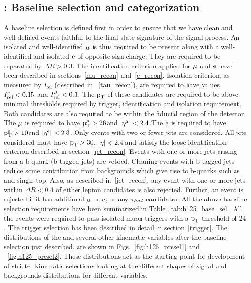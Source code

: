 \subsection{\hmue: Baseline selection and categorization}
\label{h125_presel_cat}
A baseline selection is defined first in order to ensure that we have clean and well-defined events faithful to the final state signature of the signal process. An isolated and well-identified $\mu$ is thus required to be present along with a well-identified and isolated $\text{e}$ of opposite sign charge. They are required to be separated by $\Delta R > 0.3$. The identification criterion applied for $\mu$ and $\text{e}$ have been described in sections~\ref{mu_recon} and~\ref{e_recon}. Isolation criterion, as measured by $I_\text{rel}$ (described in ~\ref{tau_recon}), are required to have values $I_\text{rel}^{\text{e}} < 0.15$ and $I_\text{rel}^{\mu} < 0.1$. The $\text{p}_\text{T}$ of these candidates are required to be above minimal thresholds required by trigger, identification and isolation requirement. Both candidates are also required to be within the fiducial region of the detector. The $\mu$ is required to have $\text{p}_\text{T}^{\mu} > 26$\GeV and $|\eta^{\mu}|<2.4$.The $\text{e}$ is required to have $\text{p}_\text{T}^{\text{e}} > 10$\GeV and $|\eta^{\text{e}}|<2.3$. Only events with two or fewer jets are considered. All jets considered must have $\text{p}_\text{T}>30$\GeV, $|\eta| < 2.4 $ and satisfy the loose identification criterion described in section~\ref{jet_recon}. Events with one or more jets arising from a b-quark (b-tagged jets) are vetoed. Cleaning events with b-tagged jets reduce some contribution from backgrounds which give rise to b-quarks such as \ttb and single top. Also, as described in~\ref{jet_recon}, any event with one or more jets within $\Delta R < 0.4$ of either lepton candidates is also rejected. Further, an event is rejected if it has additional $\mu$ or $\text{e}$, or any $\tau_{had}$ candidates. All the above baseline selection requirements have been summarized in Table~\ref{tab:h125_base_sel}. All the events were required to pass isolated muon triggers with a $\text{p}_\text{T}$ threshold of 24 \GeV. The trigger selection has been described in detail in section~\ref{trigger}. The distributions of the \mcol and several other kinematic variables after the baseline selection just described, are shown in Figs.~\ref{fig:h125_presel1} and ~\ref{fig:h125_presel2}. These distributions act as the starting point for development of stricter kinematic selections looking at the different shapes of signal and backgrounds distributions for different variables.     



